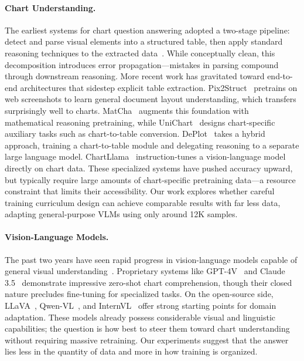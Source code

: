 ﻿\documentclass[journal]{IEEEtran}
\begin{document}
\paragraph{Chart Understanding.}
The earliest systems for chart question answering adopted a two-stage pipeline: detect and parse visual elements into a structured table, then apply standard reasoning techniques to the extracted data~\cite{kafle2018dvqa,kahou2017figureqa}. While conceptually clean, this decomposition introduces error propagation---mistakes in parsing compound through downstream reasoning. More recent work has gravitated toward end-to-end architectures that sidestep explicit table extraction. Pix2Struct~\cite{lee2023pix2struct} pretrains on web screenshots to learn general document layout understanding, which transfers surprisingly well to charts. MatCha~\cite{liu2023matcha} augments this foundation with mathematical reasoning pretraining, while UniChart~\cite{masry2023unichart} designs chart-specific auxiliary tasks such as chart-to-table conversion. DePlot~\cite{liu2023deplot} takes a hybrid approach, training a chart-to-table module and delegating reasoning to a separate large language model. ChartLlama~\cite{han2023chartllama} instruction-tunes a vision-language model directly on chart data. These specialized systems have pushed accuracy upward, but typically require large amounts of chart-specific pretraining data---a resource constraint that limits their accessibility. Our work explores whether careful training curriculum design can achieve comparable results with far less data, adapting general-purpose VLMs using only around 12K samples.

\paragraph{Vision-Language Models.}
The past two years have seen rapid progress in vision-language models capable of general visual understanding~\cite{liu2024visual,chen2024internvl,bai2023qwen}. Proprietary systems like GPT-4V~\cite{openai2023gpt4v} and Claude 3.5~\cite{anthropic2024claude} demonstrate impressive zero-shot chart comprehension, though their closed nature precludes fine-tuning for specialized tasks. On the open-source side, LLaVA~\cite{liu2024visual}, Qwen-VL~\cite{bai2023qwen}, and InternVL~\cite{chen2024internvl} offer strong starting points for domain adaptation. These models already possess considerable visual and linguistic capabilities; the question is how best to steer them toward chart understanding without requiring massive retraining. Our experiments suggest that the answer lies less in the quantity of data and more in how training is organized.
\end{document}
